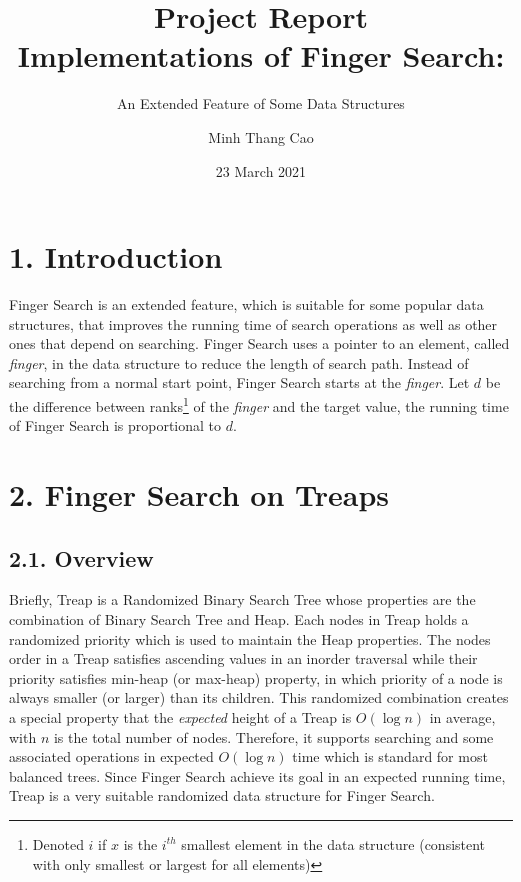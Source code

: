 \documentclass[12pt,english,]{article}
\title{\textbf{Project Report}\\
\Large{Implementations of Finger Search:}}
\subtitle{An Extended Feature of Some Data Structures}
\author{Minh Thang Cao}
\date{23 March 2021}
\begin{document}
\maketitle

\graphicspath{ {./} }

\hypertarget{section1}{%
\section{\texorpdfstring{1.
\enspace Introduction}{1. Introduction}}\label{section1}}

Finger Search is an extended feature, which is suitable for some popular
data structures, that improves the running time of search operations as
well as other ones that depend on searching. Finger Search uses a
pointer to an element, called \emph{finger}, in the data structure to
reduce the length of search path. Instead of searching from a normal
start point, Finger Search starts at the \emph{finger}. Let \(d\) be the
difference between ranks\footnote{Denoted \(i\) if \(x\) is the
  \(i^{th}\) smallest element in the data structure (consistent with
  only smallest or largest for all elements)} of the \emph{finger} and
the target value, the running time of Finger Search is proportional to
\(d\).

\hypertarget{section2}{%
\section{\texorpdfstring{2. \enspace Finger Search on
Treaps}{2. Finger Search on Treaps}}\label{section2}}

\hypertarget{overview}{%
\subsection{2.1. Overview}\label{overview}}

Briefly, Treap is a Randomized Binary Search Tree whose properties are
the combination of Binary Search Tree and Heap. Each nodes in Treap
holds a randomized priority which is used to maintain the Heap
properties. The nodes order in a Treap satisfies ascending values in an
inorder traversal while their priority satisfies min-heap (or max-heap)
property, in which priority of a node is always smaller (or larger) than
its children. This randomized combination creates a special property
that the \emph{expected} height of a Treap is \(O(\log n)\) in average,
with \(n\) is the total number of nodes. Therefore, it supports
searching and some associated operations in expected \(O(\log n)\) time
which is standard for most balanced trees. Since Finger Search achieve
its goal in an expected running time, Treap is a very suitable
randomized data structure for Finger Search.
\end{document}
